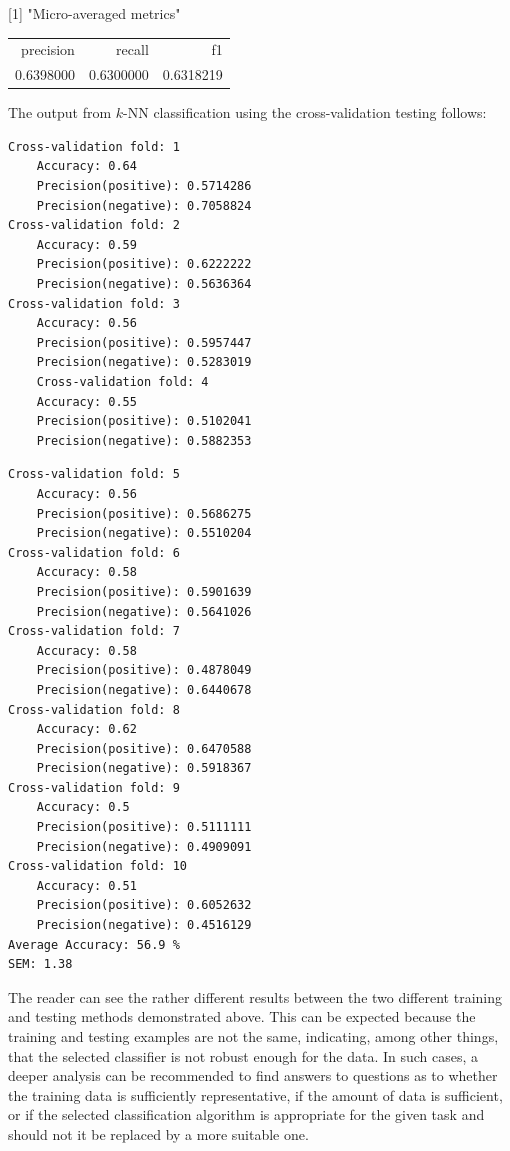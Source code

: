 \documentclass[10pt]{book}
\begin{document}
[1] "Micro-averaged metrics"

\begin{center}
\begin{tabular}{rrr}
precision & recall & f1 \\
0.6398000 & 0.6300000 & 0.6318219 \\
\end{tabular}
\end{center}

The output from $k$-NN classification using the cross-validation testing follows:

\begin{verbatim}
Cross-validation fold: 1
    Accuracy: 0.64
    Precision(positive): 0.5714286
    Precision(negative): 0.7058824
Cross-validation fold: 2
    Accuracy: 0.59
    Precision(positive): 0.6222222
    Precision(negative): 0.5636364
Cross-validation fold: 3
    Accuracy: 0.56
    Precision(positive): 0.5957447
    Precision(negative): 0.5283019
    Cross-validation fold: 4
    Accuracy: 0.55
    Precision(positive): 0.5102041
    Precision(negative): 0.5882353
\end{verbatim}

\begin{verbatim}
Cross-validation fold: 5
    Accuracy: 0.56
    Precision(positive): 0.5686275
    Precision(negative): 0.5510204
Cross-validation fold: 6
    Accuracy: 0.58
    Precision(positive): 0.5901639
    Precision(negative): 0.5641026
Cross-validation fold: 7
    Accuracy: 0.58
    Precision(positive): 0.4878049
    Precision(negative): 0.6440678
Cross-validation fold: 8
    Accuracy: 0.62
    Precision(positive): 0.6470588
    Precision(negative): 0.5918367
Cross-validation fold: 9
    Accuracy: 0.5
    Precision(positive): 0.5111111
    Precision(negative): 0.4909091
Cross-validation fold: 10
    Accuracy: 0.51
    Precision(positive): 0.6052632
    Precision(negative): 0.4516129
Average Accuracy: 56.9 %
SEM: 1.38
\end{verbatim}

The reader can see the rather different results between the two different training and testing methods demonstrated above. This can be expected because the training and testing examples are not the same, indicating, among other things, that the selected classifier is not robust enough for the data. In such cases, a deeper analysis can be recommended to find answers to questions as to whether the training data is sufficiently representative, if the amount of data is sufficient, or if the selected classification algorithm is appropriate for the given task and should not it be replaced by a more suitable one.
\end{document}
